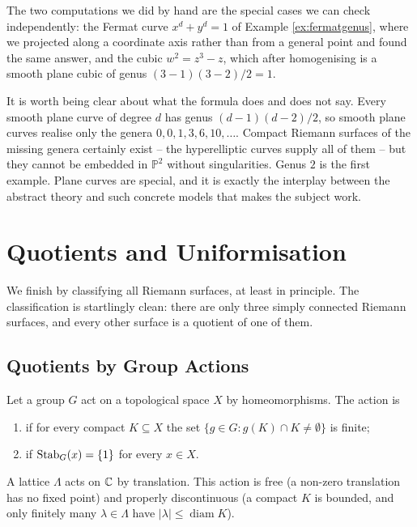 \documentclass[a4paper]{scrartcl}
\begin{document}
The two computations we did by hand are the special cases we can check independently: the
Fermat curve $x^d + y^d = 1$ of Example \ref{ex:fermatgenus}, where we projected along a
coordinate axis rather than from a general point and found the same answer, and the cubic
$w^2 = z^3 - z$, which after homogenising is a smooth plane cubic of genus
$(3-1)(3-2)/2 = 1$.

\begin{remark}
	It is worth being clear about what the formula does and does not say. Every smooth
	plane curve of degree $d$ has genus $(d-1)(d-2)/2$, so smooth plane curves realise only
	the genera $0, 0, 1, 3, 6, 10, \dots$. Compact Riemann surfaces of the missing genera
	certainly exist -- the hyperelliptic curves supply all of them -- but they cannot be
	embedded in $\mathbb{P}^2$ without singularities. Genus $2$ is the first example.
	Plane curves are special, and it is exactly the interplay between the abstract theory
	and such concrete models that makes the subject work.
\end{remark}

\section{Quotients and Uniformisation}

We finish by classifying all Riemann surfaces, at least in principle. The classification
is startlingly clean: there are only three simply connected Riemann surfaces, and every
other surface is a quotient of one of them.

\subsection{Quotients by Group Actions}

\begin{definition}
	Let a group $G$ act on a topological space $X$ by homeomorphisms. The action is
	\begin{enumerate}[label=(\roman*)]
		\item {} if for every compact $K \subseteq X$ the set
		$\{g\in G : g(K)\cap K \neq\emptyset\}$ is finite;
		\item {} if $\operatorname{Stab}_G(x) = \{1\}$ for every $x \in X$.
	\end{enumerate}
\end{definition}

\begin{example}
	A lattice $\Lambda$ acts on $\mathbb{C}$ by translation. This action is free (a non-zero
	translation has no fixed point) and properly discontinuous (a compact $K$ is bounded,
	and only finitely many $\lambda\in\Lambda$ have $|\lambda| \le \operatorname{diam}K$).
\end{example}
\end{document}
